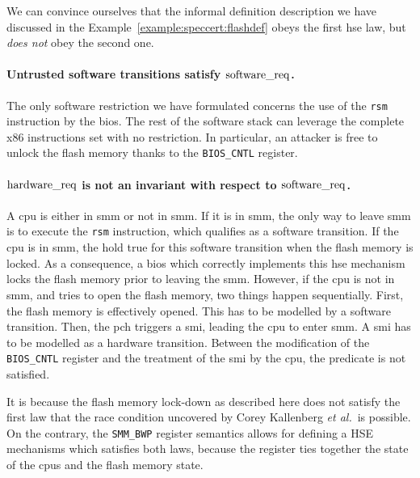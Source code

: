 \begin{example}
  We can convince ourselves that the informal definition description we have
  discussed in the Example~\ref{example:speccert:flashdef} obeys the first
  \ac{hse} law, but \emph{does not} obey the second one.
  \paragraph{Untrusted software transitions satisfy $\mathrm{software\_req}$.}
  The only software restriction we have formulated concerns the use of the
  \texttt{rsm} instruction by the \ac{bios}.
  The rest of the software stack can leverage the complete x86 instructions set
  with no restriction.
  In particular, an attacker is free to unlock the flash memory thanks to the
  \texttt{BIOS\_CNTL} register.

  \paragraph{$\mathrm{hardware\_req}$ is not an invariant with respect to
    $\mathrm{software\_req}$.}
  A \ac{cpu} is either in \ac{smm} or not in \ac{smm}.
  If it is in \ac{smm}, the only way to leave \ac{smm} is to execute the
  \texttt{rsm} instruction, which qualifies as a software transition.
  If the \ac{cpu} is in \ac{smm}, the  hold true for this
  software transition when the flash memory is locked.
  As a consequence, a \ac{bios} which correctly implements this \ac{hse}
  mechanism locks the flash memory prior to leaving the \ac{smm}.
  However, if the \ac{cpu} is not in \ac{smm}, and tries to open the flash
  memory, two things happen sequentially.
  First, the flash memory is effectively opened.
  This has to be modelled by a software transition.
  Then, the \ac{pch} triggers a \ac{smi}, leading the \ac{cpu} to enter
  \ac{smm}.
  A \ac{smi} has to be modelled as a hardware transition.
  Between the modification of the \texttt{BIOS\_CNTL} register and the treatment
  of the \ac{smi} by the \ac{cpu}, the  predicate is not
  satisfied.

  It is because the flash memory lock-down as described here does not satisfy
  the first law that the race condition uncovered by Corey Kallenberg \emph{et
    al.}\,\cite{kallenberg2015racecondition} is possible.
  On the contrary, the \texttt{SMM\_BWP} register semantics allows for defining
  a HSE mechanisms which satisfies both laws, because the register ties together
  the state of the \acp{cpu} and the flash memory state.
\end{example}


